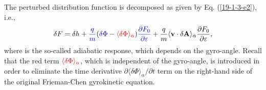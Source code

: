\documentclass{llncs}
\newcommand{\tmcolor}[2]{{\color{#1}{#2}}}
\begin{document}
The perturbed distribution function is decomposed as given by Eq.
(\ref{19-1-3-e2}), i.e.,
\begin{equation}
  \label{22-11-13-e2} \delta F = \delta h + \tmcolor{blue}{\frac{q}{m}}
  (\tmcolor{blue}{\delta \Phi} - \tmcolor{red}{\langle \delta \Phi
  \rangle_{\alpha}}) \tmcolor{blue}{\frac{\partial F_0}{\partial \varepsilon}}
  + \frac{q}{m} \langle \mathbf{v} \cdot \delta \mathbf{A} \rangle_{\alpha}
  \frac{\partial F_0}{\partial \varepsilon},
\end{equation}
where \tmcolor{blue}{the term in blue} is the so-called adiabatic response,
which depends on the gyro-angle. Recall that the red term
$\tmcolor{red}{\langle \delta \Phi \rangle_{\alpha}}$, which is independent of
the gyro-angle, is introduced in order to eliminate the time derivative
$\partial \langle \delta \Phi \rangle_{\alpha} / \partial t$ term on the
right-hand side of the original Frieman-Chen gyrokinetic equation.
\end{document}
